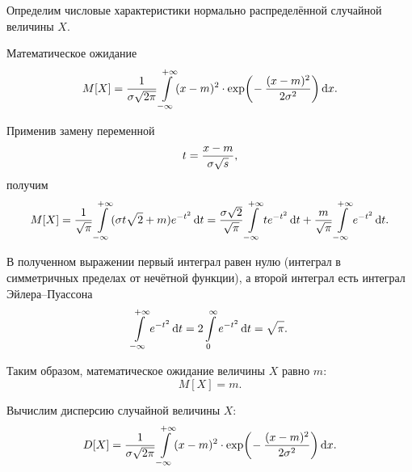 \documentclass[a4paper]{article}
\DeclareMathOperator{\expo}{exp}
\newcommand{\sqrtt}[1]{\sqrt{\vphantom{qb} #1}}
\begin{document}
                    Определим числовые характеристики нормально распределённой случайной величины $X$.
                    
                    Математическое ожидание
                    \begin{equation*}
                        M[X] = \frac{1}{\sigma \sqrtt{2 \pi}}
                            \int\limits_{-\infty}^{+\infty} (x - m)^2 \cdot
                             \expo \! \bigg( \! -\frac{(x - m)^2}{2 \sigma^2} \bigg) \dif x .
                    \end{equation*}

                    Применив замену переменной
                    \begin{equation*}
                        t = \frac{x - m}{\sigma \sqrtt{s}} ,
                    \end{equation*}
                    получим
                    \begin{equation*}
                        M[X] = \frac{1}{\sqrtt{\pi}}
                            \int\limits_{-\infty}^{+\infty} (\sigma t \sqrtt{2} + m)
                            e^{-t^2} \dif t =
                            \frac{\sigma \sqrtt{2}}{\sqrtt{\pi}}
                            \int\limits_{-\infty}^{+\infty} t e^{-t^2} \dif t +
                            \frac{m}{\sqrtt{\pi}}
                            \int\limits_{-\infty}^{+\infty} e^{-t^2} \dif t .
                    \end{equation*}

                    В полученном выражении первый интеграл равен нулю (интеграл в симметричных пределах от нечётной функции), а второй интеграл есть интеграл Эйлера--Пуассона
                    \begin{equation*}
                        \int\limits_{-\infty}^{+\infty} e^{-t^2} \dif t =
                        2 \int\limits_{0}^{\infty} e^{-t^2} \dif t = \sqrtt{\pi} .
                    \end{equation*}

                    Таким образом, математическое ожидание величины $X$ равно $m$:
                    \begin{equation*}
                        M[X] = m .
                    \end{equation*}

                    Вычислим дисперсию случайной величины $X$:
                    \begin{equation*}
                        D[X] = \frac{1}{\sigma \sqrtt{2 \pi}}
                        \int\limits_{-\infty}^{+\infty} (x - m)^2 \cdot
                             \expo \! \bigg( \! -\frac{(x - m)^2}{2 \sigma^2} \bigg) \dif x .
                    \end{equation*}
\end{document}
